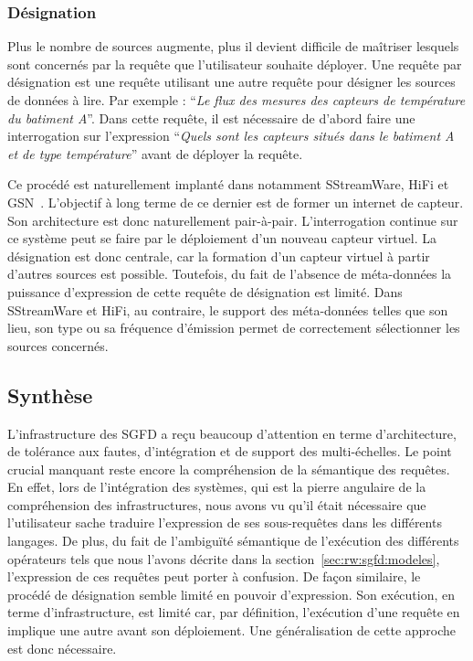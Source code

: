 \subsubsection{Désignation}
Plus le nombre de sources augmente, plus il devient difficile de maîtriser lesquels sont concernés par la requête que l'utilisateur souhaite déployer. Une requête par désignation est une requête utilisant une autre requête pour désigner les sources de données à lire. Par exemple : \enquote{\it Le flux des mesures des capteurs de température du batiment A}. Dans cette requête, il est nécessaire de d'abord faire une interrogation sur l'expression \enquote{\it Quels sont les capteurs situés dans le batiment \textit{A} et de type \textit{température}} avant de déployer la requête.

Ce procédé est naturellement implanté dans notamment SStreamWare, HiFi et GSN~\cite{Aberer:gsn}. L’objectif à long terme de ce dernier est de former un internet de capteur. Son architecture est donc naturellement pair-à-pair. L’interrogation continue sur ce système peut se faire par le déploiement d’un nouveau capteur virtuel. La désignation est donc centrale, car la formation d’un capteur virtuel à partir d’autres sources est possible. Toutefois, du fait de l’absence de méta-données la puissance d'expression de cette requête de désignation est limité. Dans SStreamWare et HiFi, au contraire, le support des méta-données telles que son lieu, son type ou sa fréquence d'émission permet de correctement sélectionner les sources concernés.

\subsection{Synthèse}
L'infrastructure des SGFD a reçu beaucoup d'attention en terme d'architecture, de tolérance aux fautes, d'intégration et de support des multi-échelles. Le point crucial manquant reste encore la compréhension de la sémantique des requêtes. En effet, lors de l'intégration des systèmes, qui est la pierre angulaire de la compréhension des infrastructures, nous avons vu qu'il était nécessaire que l'utilisateur sache traduire l'expression de ses sous-requêtes dans les différents langages. De plus, du fait de l'ambiguïté sémantique de l'exécution des différents opérateurs tels que nous l'avons décrite dans la section~\ref{sec:rw:sgfd:modeles}, l'expression de ces requêtes peut porter à confusion. De façon similaire, le procédé de désignation semble limité en pouvoir d'expression. Son exécution, en terme d'infrastructure, est limité car, par définition, l'exécution d'une requête en implique une autre avant son déploiement. Une généralisation de cette approche est donc nécessaire.